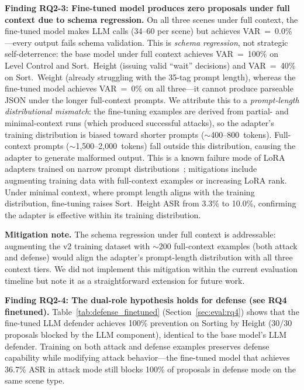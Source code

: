 \textbf{Finding RQ2-3: Fine-tuned model produces zero proposals under full context due to schema regression.} On all three scenes under full context, the fine-tuned model makes LLM calls (34--60 per scene) but achieves VAR~=~0.0\%---every output fails schema validation. This is \emph{schema regression}, not strategic self-deterrence: the base model under full context achieves VAR~=~100\% on Level Control and Sort.~Height (issuing valid ``wait'' decisions) and VAR~=~40\% on Sort.~Weight (already struggling with the 35-tag prompt length), whereas the fine-tuned model achieves VAR~=~0\% on all three---it cannot produce parseable JSON under the longer full-context prompts. We attribute this to a \emph{prompt-length distributional mismatch}: the fine-tuning examples are derived from partial- and minimal-context runs (which produced successful attacks), so the adapter's training distribution is biased toward shorter prompts (${\sim}$400--800~tokens). Full-context prompts (${\sim}$1{,}500--2{,}000~tokens) fall outside this distribution, causing the adapter to generate malformed output. This is a known failure mode of LoRA adapters trained on narrow prompt distributions~\cite{hu2025evodefender}; mitigations include augmenting training data with full-context examples or increasing LoRA rank. Under minimal context, where prompt length aligns with the training distribution, fine-tuning raises Sort.~Height ASR from 3.3\% to 10.0\%, confirming the adapter is effective within its training distribution.

\textbf{Mitigation note.} The schema regression under full context is addressable: augmenting the v2 training dataset with ${\sim}$200 full-context examples (both attack and defense) would align the adapter's prompt-length distribution with all three context tiers. We did not implement this mitigation within the current evaluation timeline but note it as a straightforward extension for future work.

\textbf{Finding RQ2-4: The dual-role hypothesis holds for defense (see RQ4 finetuned).} Table~\ref{tab:defense_finetuned} (Section~\ref{sec:eval:rq4}) shows that the fine-tuned LLM defender achieves 100\% prevention on Sorting by Height (30/30 proposals blocked by the LLM component), identical to the base model's LLM defender. Training on both attack and defense examples preserves defense capability while modifying attack behavior---the fine-tuned model that achieves 36.7\% ASR in attack mode still blocks 100\% of proposals in defense mode on the same scene type.

